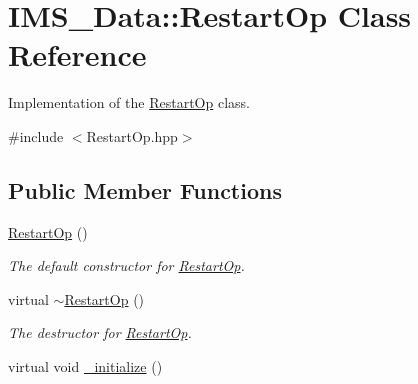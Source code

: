 \hypertarget{classIMS__Data_1_1RestartOp}{
\section{IMS\_\-Data::RestartOp Class Reference}
\label{classIMS__Data_1_1RestartOp}
}


Implementation of the \hyperlink{classIMS__Data_1_1RestartOp}{RestartOp} class.  




{\ttfamily \#include $<$RestartOp.hpp$>$}

\subsection*{Public Member Functions}
\begin{DoxyCompactItemize}
\item 
\hypertarget{classIMS__Data_1_1RestartOp_a3e583af41aa99aca32da019fa32b0bd4}{
\hyperlink{classIMS__Data_1_1RestartOp_a3e583af41aa99aca32da019fa32b0bd4}{RestartOp} ()}
\label{classIMS__Data_1_1RestartOp_a3e583af41aa99aca32da019fa32b0bd4}

\begin{DoxyCompactList}\small\item\em The default constructor for \hyperlink{classIMS__Data_1_1RestartOp}{RestartOp}. \item\end{DoxyCompactList}\item 
\hypertarget{classIMS__Data_1_1RestartOp_a64fec1f6f995e77636de68dcad94872f}{
virtual \hyperlink{classIMS__Data_1_1RestartOp_a64fec1f6f995e77636de68dcad94872f}{$\sim$RestartOp} ()}
\label{classIMS__Data_1_1RestartOp_a64fec1f6f995e77636de68dcad94872f}

\begin{DoxyCompactList}\small\item\em The destructor for \hyperlink{classIMS__Data_1_1RestartOp}{RestartOp}. \item\end{DoxyCompactList}\item 
\hypertarget{classIMS__Data_1_1RestartOp_a5e02ad3f7eb67d9bd655b55dac04a65b}{
virtual void \hyperlink{classIMS__Data_1_1RestartOp_a5e02ad3f7eb67d9bd655b55dac04a65b}{\_\-initialize} ()}
\label{classIMS__Data_1_1RestartOp_a5e02ad3f7eb67d9bd655b55dac04a65b}


\end{DoxyCompactItemize}
